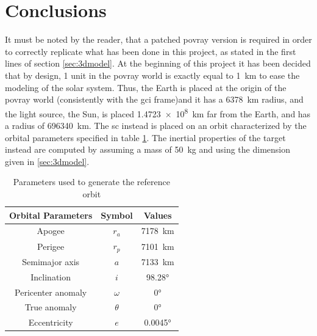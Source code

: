\section{Conclusions}
It must be noted by the reader, that a patched \acrshort{povray} version is required in order to correctly replicate what has been done in this project, as stated in the first lines of section \ref{sec:3dmodel}. At the beginning of this project it has been decided that by design, 1 unit in the \acrshort{povray} world is exactly equal to \SI{1}{\km} to ease the modeling of the solar system. Thus, the Earth is placed at the origin of the \acrshort{povray} world (consistently with the \acrshort{gci} frame)and it has a \SI{6378}{\km} radius, and the light source, the Sun, is placed \SI{1.4723e8}{\km} far from the Earth, and has a radius of \SI{696340}{\km}.
The \acrshort{sc} instead is placed on an orbit characterized by the orbital parameters specified in table \ref{tab:orbitalParameters}. The inertial properties of the target instead are computed by assuming a mass of \SI{50}{\kg} and using the dimension given in \ref{sec:3dmodel}.

\begin{table}[htbp]
  \centering
  \begin{tabular}{ccc}
    \hline
    \hline
    Orbital Parameters & Symbol   & Values         \\
    \hline
    Apogee             & $r_a$    & \SI{7178}{\km} \\
    \hline
    Perigee            & $r_p$    & \SI{7101}{\km} \\
    \hline
    Semimajor axis     & $a$      & \SI{7133}{\km} \\
    \hline
    Inclination        & $i$      & \ang{98.28}    \\
    \hline
    Pericenter anomaly & $\omega$ & \ang{0}        \\
    \hline
    True anomaly       & $\theta$ & \ang{0}        \\
    \hline
    Eccentricity       & $e$      & \ang{0.0045}   \\
    \hline
    \hline
  \end{tabular}
  \caption{Parameters used to generate the reference orbit \cite{prismaOrbitParameters}}
  \label{tab:orbitalParameters}
\end{table}

